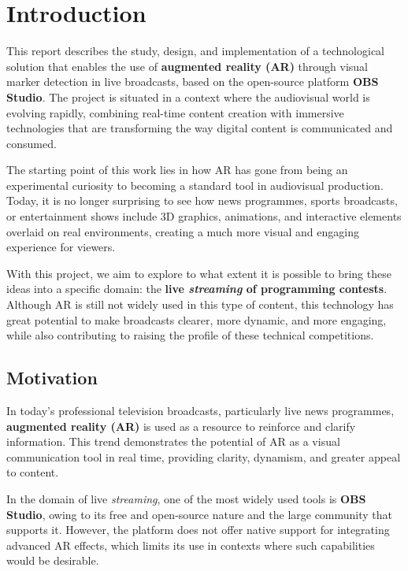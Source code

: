 \chapter{Introduction}
\label{cap:introduction}


This report describes the study, design, and implementation of a technological solution that enables the use of \textbf{augmented reality (AR)} through visual marker detection in live broadcasts, based on the open-source platform \textbf{OBS Studio}. The project is situated in a context where the audiovisual world is evolving rapidly, combining real-time content creation with immersive technologies that are transforming the way digital content is communicated and consumed.

The starting point of this work lies in how AR has gone from being an experimental curiosity to becoming a standard tool in audiovisual production. Today, it is no longer surprising to see how news programmes, sports broadcasts, or entertainment shows include 3D graphics, animations, and interactive elements overlaid on real environments, creating a much more visual and engaging experience for viewers.

With this project, we aim to explore to what extent it is possible to bring these ideas into a specific domain: the \textbf{live \textit{streaming} of programming contests}. Although AR is still not widely used in this type of content, this technology has great potential to make broadcasts clearer, more dynamic, and more engaging, while also contributing to raising the profile of these technical competitions.


\section{Motivation}
\label{sec:motivacion_en}

In today's professional television broadcasts, particularly live news programmes, \textbf{augmented reality (AR)} is used as a resource to reinforce and clarify information. This trend demonstrates the potential of AR as a visual communication tool in real time, providing clarity, dynamism, and greater appeal to content.

In the domain of live \textit{streaming}, one of the most widely used tools is \textbf{OBS Studio}, owing to its free and open-source nature and the large community that supports it. However, the platform does not offer native support for integrating advanced AR effects, which limits its use in contexts where such capabilities would be desirable.


